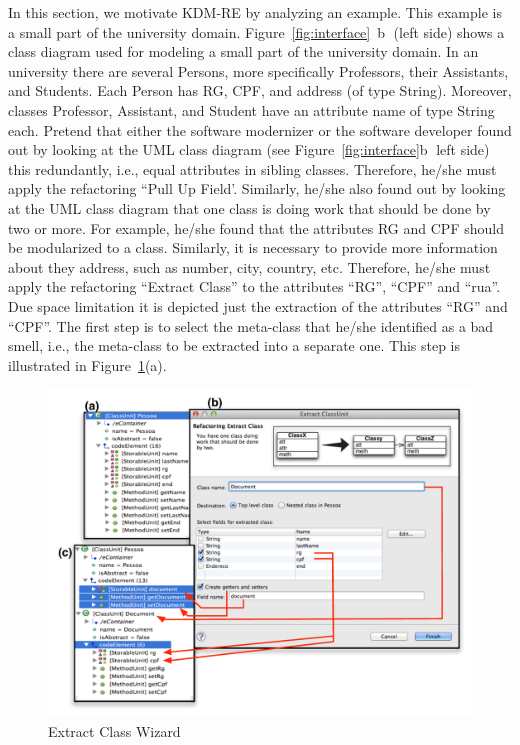 \documentclass[12pt]{article}
\begin{document}
In this section, we motivate KDM-RE by analyzing an example. This example is a small part of the university domain.  Figure~\ref{fig:interface}~\textcircled{b} (left side) shows a class diagram used for modeling a small part of the
university domain. In an university there are several Persons, more specifically Professors, their Assistants, and Students. Each Person has RG, CPF, and address (of type String). Moreover, classes Professor, Assistant, and Student have an attribute name of type String each. Pretend that either the software modernizer or the software developer found out by looking at the UML class diagram (see Figure~\ref{fig:interface}\textcircled{b} left side) this redundantly, i.e., equal attributes in sibling classes. Therefore, he/she must apply the refactoring ``Pull Up Field'. Similarly, he/she also found out by looking at the UML class diagram that one class is doing work that should be done by two or more. For example, he/she found that the attributes RG and CPF should be modularized to a class. Similarly, it is necessary to provide more information about they address, such as number, city, country, etc. Therefore, he/she must apply the refactoring ``Extract Class'' to the attributes ``RG'', ``CPF'' and ``rua''. Due space limitation it is depicted just the extraction of the attributes ``RG'' and ``CPF''.  The first step is to select the meta-class that he/she identified as a bad smell, i.e., the meta-class to be extracted into a separate one.  This step is illustrated in Figure~\ref{fig:wizard}(a). 

\begin{figure}[!ht]
\centering
  \includegraphics[scale=0.6]{figure/Wizard2}
\caption{Extract Class Wizard}
\label{fig:wizard}
\end{figure}
\end{document}
